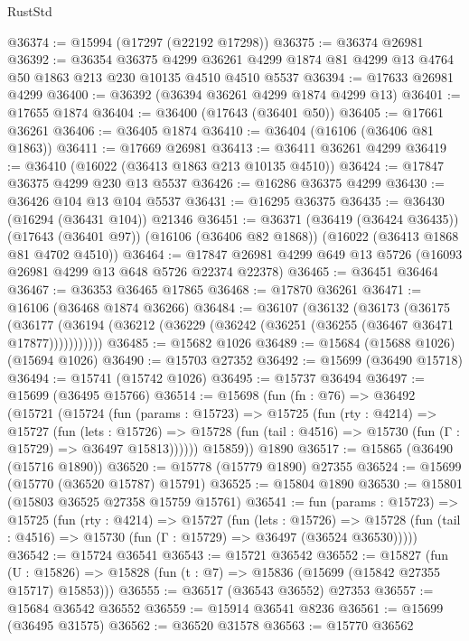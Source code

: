 \begin{lexlean}{RustStd}
\begin{coremodule}
@36374 := @15994 (@17297 (@22192 @17298))
@36375 := @36374 @26981
@36392 := @36354
    @36375
    @4299
    @36261
    @4299
    @1874
    @81
    @4299
    @13
    @4764
    @50
    @1863
    @213
    @230
    @10135
    @4510
    @4510
    @5537
@36394 := @17633 @26981 @4299
@36400 := @36392 (@36394 @36261 @4299 @1874 @4299 @13)
@36401 := @17655 @1874
@36404 := @36400 (@17643 (@36401 @50))
@36405 := @17661 @36261
@36406 := @36405 @1874
@36410 := @36404 (@16106 (@36406 @81 @1863))
@36411 := @17669 @26981
@36413 := @36411 @36261 @4299
@36419 := @36410 (@16022 (@36413 @1863 @213 @10135 @4510))
@36424 := @17847 @36375 @4299 @230 @13 @5537
@36426 := @16286 @36375 @4299
@36430 := @36426 @104 @13 @104 @5537
@36431 := @16295 @36375
@36435 := @36430 (@16294 (@36431 @104)) @21346
@36451 := @36371
    (@36419 (@36424 @36435))
    (@17643 (@36401 @97))
    (@16106 (@36406 @82 @1868))
    (@16022 (@36413 @1868 @81 @4702 @4510))
@36464 := @17847 @26981 @4299 @649 @13 @5726 (@16093 @26981 @4299 @13 @648 @5726 @22374 @22378)
@36465 := @36451 @36464
@36467 := @36353 @36465 @17865
@36468 := @17870 @36261
@36471 := @16106 (@36468 @1874 @36266)
@36484 := @36107
    (@36132
      (@36173
        (@36175
          (@36177 (@36194 (@36212 (@36229 (@36242 (@36251 (@36255 (@36467 @36471 @17877)))))))))))
@36485 := @15682 @1026
@36489 := @15684 (@15688 @1026) (@15694 @1026)
@36490 := @15703 @27352
@36492 := @15699 (@36490 @15718)
@36494 := @15741 (@15742 @1026)
@36495 := @15737 @36494
@36497 := @15699 (@36495 @15766)
@36514 := @15698
    (fun (fn : @76) =>
    @36492
      (@15721
        (@15724
          (fun (params : @15723) =>
          @15725
            (fun (rty : @4214) =>
            @15727
              (fun (lets : @15726) =>
              @15728 (fun (tail : @4516) => @15730 (fun (Γ : @15729) => @36497 @15813))))))
        @15859))
    @1890
@36517 := @15865 (@36490 (@15716 @1890))
@36520 := @15778 (@15779 @1890) @27355
@36524 := @15699 (@15770 (@36520 @15787) @15791)
@36525 := @15804 @1890
@36530 := @15801 (@15803 @36525 @27358 @15759 @15761)
@36541 := fun (params : @15723) =>
  @15725
    (fun (rty : @4214) =>
    @15727
      (fun (lets : @15726) =>
      @15728 (fun (tail : @4516) => @15730 (fun (Γ : @15729) => @36497 (@36524 @36530)))))
@36542 := @15724 @36541
@36543 := @15721 @36542
@36552 := @15827
    (fun (U : @15826) => @15828 (fun (t : @7) => @15836 (@15699 (@15842 @27355 @15717) @15853)))
@36555 := @36517 (@36543 @36552) @27353
@36557 := @15684 @36542 @36552
@36559 := @15914 @36541 @8236
@36561 := @15699 (@36495 @31575)
@36562 := @36520 @31578
@36563 := @15770 @36562

\end{coremodule}
\end{lexlean}
